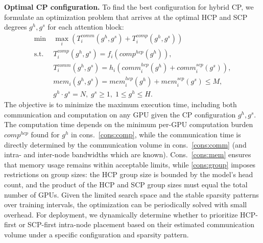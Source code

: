 \noindent\textbf{Optimal CP configuration.} 
To find the best configuration for hybrid CP, we formulate an optimization problem that arrives at the optimal HCP and SCP degrees $g^{h},g^{s}$ for each attention block:
\begin{align}
 \min\ & \mathop{\max}\limits_{i}\left({T_{i}^{comm}(g^{h},g^{s})}+{T_{i}^{comp}(g^{h},g^{s})}\right) \nonumber\\
\text{s.t.}\ \ & T_{i}^{comp}(g^{h},g^{s})=f_i(comp^{hcp}(g^{h})), \label{cons:comp} \\
& T_{i}^{comm}(g^{h},g^{s})=h_i(comm_i^{hcp}(g^{h})+comm_i^{scp}(g^{s})), \label{cons:comm} \\
& mem_i\left(g^{h},g^{s}\right) = mem_i^{hcp}(g^h)+mem_i^{scp}(g^s) \leq M, \label{cons:mem} \\
& g^{h} \cdot g^{s} = N,\;  g^{s}\ge 1, \; 1 \leq g^{h} \leq H.\label{cons:group} 
\end{align}
The objective is to minimize the maximum execution time, including both communication and computation on any GPU given the CP configuration $g^{h},g^{s}$. 
The computation time depends on the minimum per-GPU computation burden $comp^{hcp}$ found for $g^{h}$ in cons.~\eqref{cons:comp}, while the communication time is directly determined by the communication volume in cons.~\eqref{cons:comm} (and intra- and inter-node bandwidths which are known).
Cons.~\eqref{cons:mem} ensures that memory usage remains within acceptable limits, while \eqref{cons:group} imposes restrictions on group sizes: the HCP group size is bounded by the model's head count, and the product of the HCP and SCP group sizes must equal the total number of GPUs. 
Given the limited search space and the stable sparsity patterns over training intervals, the optimization can be periodically solved with small overhead.
For deployment, we dynamically determine whether to prioritize HCP-first or SCP-first intra-node placement based on their estimated communication volume under a specific configuration and sparsity pattern.





